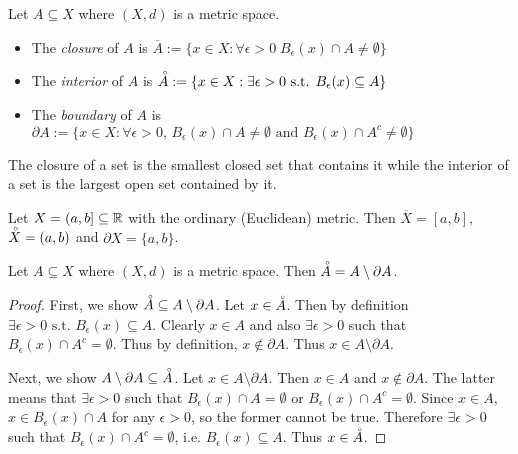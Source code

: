 \documentclass{article}
\begin{document}
\begin{definition}
Let $A\subseteq X$ where $(X,d)$ is a metric space. 
\begin{itemize}
    \item The \emph{closure} of $A$ is  $\overline A :=\{x \in X: \forall \epsilon > 0 \; B_\epsilon(x) \cap A \neq \emptyset \}$
    \item The \emph{interior} of $A$ is  $\accentset{\circ} A :=\{x \in X: \exists \epsilon > 0 \text{ s.t. } B_\epsilon(x) \subseteq A \}$
    \item The \emph{boundary} of $A$ is $\partial A := \{ x \in X: \forall \epsilon > 0, \, B_\epsilon(x) \cap A \neq \emptyset \text{ and }  B_\epsilon(x) \cap A^c \neq \emptyset\}$
\end{itemize}
\end{definition}
The closure of a set is the smallest closed set that contains it while the interior of a set is the largest open set contained by it. 



\begin{example}
Let $X = (a, b] \subseteq {\mathbb{R}}$ with the ordinary (Euclidean) metric. Then $\overline X = [a,b]$, $\accentset{\circ} X = (a,b)$ and $\partial X = \{a,b\}$.
\end{example}

\begin{proposition}
 Let $A\subseteq X$ where $(X,d)$ is a metric space. Then $\accentset{\circ} A = A \setminus \partial A$.
\end{proposition}
\begin{proof}
First, we show $\accentset{\circ} A\subseteq A \setminus \partial A$. Let $x \in \accentset{\circ} A$. Then by definition $\exists \epsilon > 0 \text{ s.t. } B_\epsilon(x) \subseteq A$. Clearly $x \in A$ and also $\exists \epsilon > 0$ such that $B_\epsilon(x) \cap A^c = \emptyset$. Thus by definition, $x \notin \partial A$. Thus $x \in A \setminus \partial A$.

Next, we show $A \setminus \partial A \subseteq \accentset{\circ} A$. Let $x \in A \setminus \partial A$. Then $x \in A$ and $x \notin \partial A$. The latter means that $\exists \epsilon > 0$ such that $B_\epsilon(x) \cap A = \emptyset$ or  $B_\epsilon(x) \cap A^c = \emptyset$. Since $x \in A$, $x \in B_\epsilon(x) \cap A$ for any $\epsilon > 0$, so the former cannot be true. Therefore $\exists \epsilon > 0$ such that $B_\epsilon(x) \cap A^c = \emptyset$, i.e. $B_\epsilon(x) \subseteq A$. Thus $x \in \accentset{\circ} A$.
\end{proof}
\end{document}
